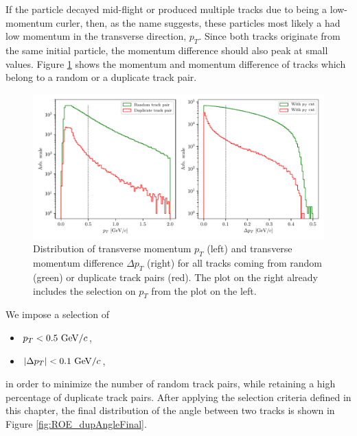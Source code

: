 If the particle decayed mid-flight or produced multiple tracks due to being a low-momentum curler, then, as the name suggests, these particles most likely a had low momentum in the transverse direction, $p_T$. Since both tracks originate from the same initial particle, the momentum difference should also peak at small values. Figure \ref{fig:ROE_dupPt} shows the momentum and momentum difference of tracks which belong to a random or a duplicate track pair.

\begin{figure}[H]
	\centering
	\captionsetup{width=0.8\linewidth}
	\includegraphics[width=\linewidth]{fig/ROECleanup_dup_pt}
	\caption{Distribution of transverse momentum $p_T$ (left) and transverse momentum difference $\Delta p_T$ (right) for all tracks coming from random (green) or duplicate track pairs (red). The plot on the right already includes the selection on $p_T$ from the plot on the left.}
	\label{fig:ROE_dupPt}
\end{figure}

We impose a selection of
\begin{itemize}
	\item $p_T < 0.5\mathrm{~GeV}/c$,
	\item $\vert \Delta p_T \vert < 0.1\mathrm{~GeV}/c$,
\end{itemize}

in order to minimize the number of random track pairs, while retaining a high percentage of duplicate track pairs. After applying the selection criteria defined in this chapter, the final distribution of the angle between two tracks is shown in Figure \ref{fig:ROE_dupAngleFinal}.

